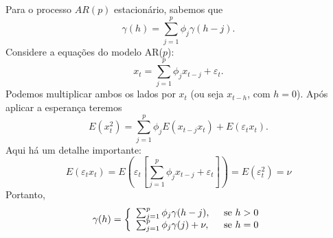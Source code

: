 \documentclass[
  letterpaper,
  DIV=11,
  numbers=noendperiod]{scrartcl}
\theoremstyle{definition}
\theoremstyle{definition}
\theoremstyle{plain}
\theoremstyle{plain}
\theoremstyle{remark}
\begin{document}
Para o processo \(AR(p)\) estacionário, sabemos que
\[\gamma(h) = \sum_{j=1}^p \phi_j \gamma( h-j).\] Considere a equações
do modelo AR(\(p\)):
\[x_t = \sum_{j=1}^p \phi_j x_{t-j}+\varepsilon_t.\] Podemos multiplicar
ambos os lados por \(x_t\) (ou seja \(x_{t-h}\), com \(h=0\)). Após
aplicar a esperança teremos
\[E(x_t^2) = \sum_{j=1}^p \phi_j E(x_{t-j}x_{t})+E(\varepsilon_tx_{t}).\]
Aqui há um detalhe importante:\\
\[E(\varepsilon_tx_{t})=E\left(\varepsilon_t\left[\sum_{j=1}^p \phi_j x_{t-j}+\varepsilon_t\right]\right)=E(\varepsilon_t^2)=\nu\]
Portanto, \begin{align}   
    \gamma(h)=\left\{\begin{array}{ll}
    \sum_{j=1}^p \phi_j \gamma( h-j),&\;\;\hbox{se }h>0\\
    \sum_{j=1}^p \phi_j \gamma( j)+\nu,&\;\;\hbox{se }h=0 \\
    \end{array}\right.
    \end{align}
\end{document}
